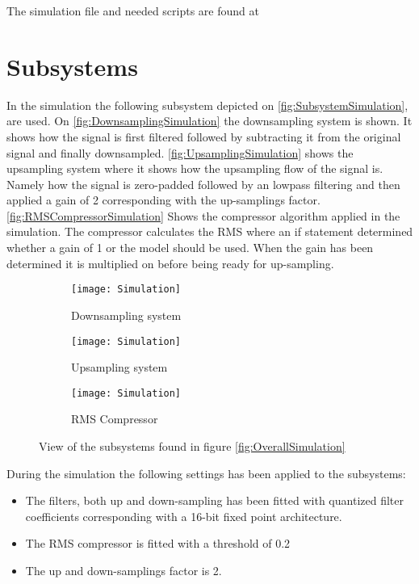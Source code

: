 The simulation file and needed scripts are found at 

\section{Subsystems}
In the simulation the following subsystem depicted on \autoref{fig:SubsystemSimulation}, are used. On \autoref{fig:DownsamplingSimulation} the downsampling system is shown. It shows how the signal is first filtered followed by subtracting it from the original signal and finally downsampled. \autoref{fig:UpsamplingSimulation} shows the upsampling system where it shows how the upsampling flow of the signal is. Namely how the signal is zero-padded followed by an lowpass filtering and then applied a gain of 2 corresponding with the up-samplings factor. \autoref{fig:RMSCompressorSimulation} Shows the compressor algorithm applied in the simulation. The compressor calculates the RMS where an if statement determined whether a gain of 1 or the model should be used. When the gain has been determined it is multiplied on before being ready for up-sampling. 
\begin{figure}[H]
\centering
\begin{subfigure}[t]{0.49\textwidth}
    \centering
\texttt{[image: Simulation]}
    \caption{Downsampling system}
    \label{fig:DownsamplingSimulation}
\end{subfigure}
\begin{subfigure}[t]{0.49\textwidth}
    \centering
\texttt{[image: Simulation]}
    \caption{Upsampling system}
    \label{fig:UpsamplingSimulation}
\end{subfigure}
\begin{subfigure}[t]{\textwidth}
    \centering
\texttt{[image: Simulation]}
    \caption{RMS Compressor}
    \label{fig:RMSCompressorSimulation}
\end{subfigure}
\label{fig:SubsystemSimulation}
\caption{View of the subsystems found in figure \ref{fig:OverallSimulation}}
\end{figure}


During the simulation the following settings has been applied to the subsystems:
\begin{itemize}
\item The filters, both up and down-sampling has been fitted with quantized filter coefficients corresponding with a 16-bit fixed point architecture.
\item The RMS compressor is fitted with a threshold of 0.2 
\item The up and down-samplings factor is 2.
\end{itemize}

